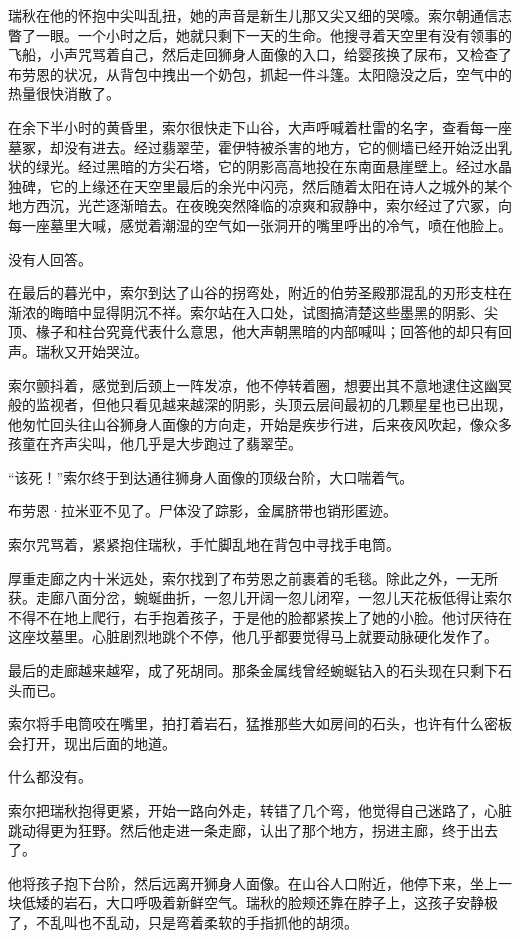 \documentclass[AutoFakeBold=true]{book}
\begin{document}
瑞秋在他的怀抱中尖叫乱扭，她的声音是新生儿那又尖又细的哭嚎。索尔朝通信志瞥了一眼。一个小时之后，她就只剩下一天的生命。他搜寻着天空里有没有领事的飞船，小声咒骂着自己，然后走回狮身人面像的入口，给婴孩换了尿布，又检查了布劳恩的状况，从背包中拽出一个奶包，抓起一件斗篷。太阳隐没之后，空气中的热量很快消散了。

在余下半小时的黄昏里，索尔很快走下山谷，大声呼喊着杜雷的名字，查看每一座墓冢，却没有进去。经过翡翠茔，霍伊特被杀害的地方，它的侧墙已经开始泛出乳状的绿光。经过黑暗的方尖石塔，它的阴影高高地投在东南面悬崖壁上。经过水晶独碑，它的上缘还在天空里最后的余光中闪亮，然后随着太阳在诗人之城外的某个地方西沉，光芒逐渐暗去。在夜晚突然降临的凉爽和寂静中，索尔经过了穴冢，向每一座墓里大喊，感觉着潮湿的空气如一张洞开的嘴里呼出的冷气，喷在他脸上。

没有人回答。

在最后的暮光中，索尔到达了山谷的拐弯处，附近的伯劳圣殿那混乱的刃形支柱在渐浓的晦暗中显得阴沉不祥。索尔站在入口处，试图搞清楚这些墨黑的阴影、尖顶、椽子和柱台究竟代表什么意思，他大声朝黑暗的内部喊叫；回答他的却只有回声。瑞秋又开始哭泣。

索尔颤抖着，感觉到后颈上一阵发凉，他不停转着圈，想要出其不意地逮住这幽冥般的监视者，但他只看见越来越深的阴影，头顶云层间最初的几颗星星也已出现，他匆忙回头往山谷狮身人面像的方向走，开始是疾步行进，后来夜风吹起，像众多孩童在齐声尖叫，他几乎是大步跑过了翡翠茔。

``{\kaishu 该死！}''索尔终于到达通往狮身人面像的顶级台阶，大口喘着气。

布劳恩·拉米亚不见了。尸体没了踪影，金属脐带也销形匿迹。

索尔咒骂着，紧紧抱住瑞秋，手忙脚乱地在背包中寻找手电筒。

厚重走廊之内十米远处，索尔找到了布劳恩之前裹着的毛毯。除此之外，一无所获。走廊八面分岔，蜿蜒曲折，一忽儿开阔一忽儿闭窄，一忽儿天花板低得让索尔不得不在地上爬行，右手抱着孩子，于是他的脸都紧挨上了她的小脸。他讨厌待在这座坟墓里。心脏剧烈地跳个不停，他几乎都要觉得马上就要动脉硬化发作了。

最后的走廊越来越窄，成了死胡同。那条金属线曾经蜿蜒钻入的石头现在只剩下石头而已。

索尔将手电筒咬在嘴里，拍打着岩石，猛推那些大如房间的石头，也许有什么密板会打开，现出后面的地道。

什么都没有。

索尔把瑞秋抱得更紧，开始一路向外走，转错了几个弯，他觉得自己迷路了，心脏跳动得更为狂野。然后他走进一条走廊，认出了那个地方，拐进主廊，终于出去了。

他将孩子抱下台阶，然后远离开狮身人面像。在山谷人口附近，他停下来，坐上一块低矮的岩石，大口呼吸着新鲜空气。瑞秋的脸颊还靠在脖子上，这孩子安静极了，不乱叫也不乱动，只是弯着柔软的手指抓他的胡须。
\end{document}
